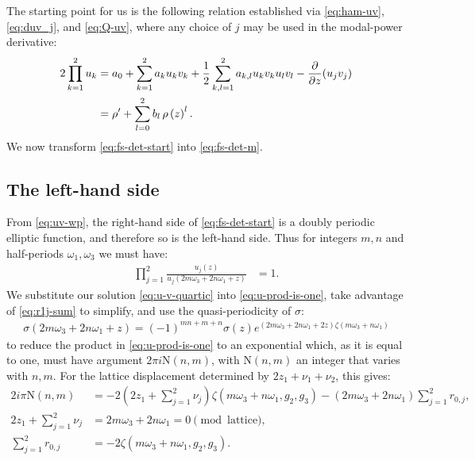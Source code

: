 \documentclass[11pt,a4paper]{article}
\numberwithin{equation}{section}
\begin{document}
The starting point for us is the following relation established via \eqref{eq:ham-uv}, \eqref{eq:duv_j}, and \eqref{eq:Q-uv}, where any choice of $j$ may be used in the modal-power derivative:
\begin{align}
2 \prod_{k=1}^{2} u_k &= {a}_{0} + \sum_{k=1}^{2} {a}_{k} u_k v_k  + \frac{1}{2}\sum\limits_{k,l=1}^{2} {a}_{k,l} u_k v_k u_l v_l - \frac{\partial}{\partial z}(u_j v_j) \notag \\
&=\rho' + \sum_{l=0}^{2}b_l\,\rho\left(z\right)^l. \label{eq:fs-det-start}
\end{align}
We now transform \eqref{eq:fs-det-start} into \eqref{eq:fs-det-m}.

\subsection{The left-hand side}
From \eqref{eq:uv-wp}, the right-hand side of \eqref{eq:fs-det-start} is a doubly periodic elliptic function, and therefore so is the left-hand side. Thus for integers $m,n$ and half-periods $\omega_1, \omega_3$ we must have:
\begin{align}
\prod_{j=1}^{2} \frac{u_j{\left(z\right)}}{u_j{\left(2 m {\omega}_{3} + 2 n {\omega}_{1} + z\right)}} & = 1. \label{eq:u-prod-is-one}
\end{align}
We substitute our solution \eqref{eq:u-v-quartic} into \eqref{eq:u-prod-is-one}, take advantage of \eqref{eq:r1j-sum} to simplify, and use the quasi-periodicity of $\sigma$:
\begin{align}
\sigma{\left(2 m {\omega}_{3} + 2 n {\omega}_{1} + z\right)} = \left(-1\right)^{m n + m + n} \sigma{\left(z\right)} e^{\left(2 m {\omega}_{3} + 2 n {\omega}_{1} + 2 z\right) \zeta{\left(m {\omega}_{3} + n {\omega}_{1}\right)}} \label{eq:quasi-sigma}
\end{align}
to reduce the product in \eqref{eq:u-prod-is-one} to an exponential which, as it is equal to one, must have argument $2\pi i \mathrm{N}(n,m)$, with $\mathrm{N}(n,m)$ an integer that varies with $n,m$.
For the lattice displacement determined by $2 z_1+\nu_1+\nu_2$, this gives:
\begin{align}
2 i \pi \mathrm{N}{\left(n,m \right)} &= - 2 \left(2 z_{1} + \sum_{j=1}^{2} {\nu}_{j}\right) \zeta{\left(m {\omega}_{3} + n {\omega}_{1},g_{2},g_{3} \right)} - \left(2 m {\omega}_{3} + 2 n {\omega}_{1}\right) \sum_{j=1}^{2} {r}_{0,j}, \label{eq:exp-arg-is-one} \\ 
2 z_{1} + \sum_{j=1}^{2} {\nu}_{j} &= 2 m {\omega}_{3} + 2 n {\omega}_{1} = 0 \pmod{\text{lattice}}, \label{eq:nuj-sum-zero}  \\
\sum_{j=1}^{2} {r}_{0,j} &= - 2 \zeta{\left(m {\omega}_{3} + n {\omega}_{1},g_{2},g_{3} \right)}. \label{eq:roj-is-zeta} 
\end{align}
\end{document}
